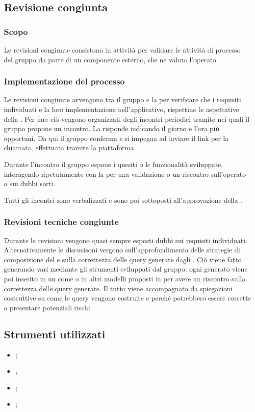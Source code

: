 \subsection{Revisione congiunta}\label{revisione_congiunta}

\subsubsection{Scopo}
\par Le revisioni congiunte consistono in attività per validare le attività di processo del gruppo da parte di un componente esterno, che ne valuta l'operato

\subsubsection{Implementazione del processo}
\par Le revisioni congiunte avvengono tra il gruppo e la  per verificare che i requisiti individuati e la loro implementazione nell'applicativo, rispettino le aspettative della . Per fare ciò vengono organizzati degli incontri periodici tramite  nei quali il gruppo propone un incontro. La  risponde indicando il giorno e l'ora più opportuni. Da qui il gruppo conferma e si impegna ad inviare il link per la chiamata, effettuata tramite la piattaforma .
\par Durante l'incontro il gruppo espone i quesiti o le funzionalità sviluppate, interagendo ripetutamente con la  per una validazione o un riscontro sull'operato o sui dubbi sorti.
\par Tutti gli incontri sono verbalizzati e sono poi sottoposti all'approvazione della .

\subsubsection{Revisioni tecniche congiunte}
\par Durante le revisioni vengono quasi sempre esposti dubbi sui requisiti individuati. Alternativamente le discusisoni vergono sull'approfondimento delle strategie di composizione del  e sulla correttezza delle query generate dagli . Ciò viene fatto generando vari  mediante gli strumenti sviluppati dal gruppo: ogni  generato viene poi inserito in un  come  o in altri modelli proposti in  per avere un riscontro sulla correttezza delle query generate. Il tutto viene accompagnato da spiegazioni costruttive su come le query vengono costruite e perché potrebbero essere corrette o presentare potenziali rischi.

\subsection{Strumenti utilizzati}
\begin{itemize}
    \item {};
    \item {};
    \item {};
    \item {};
\end{itemize}